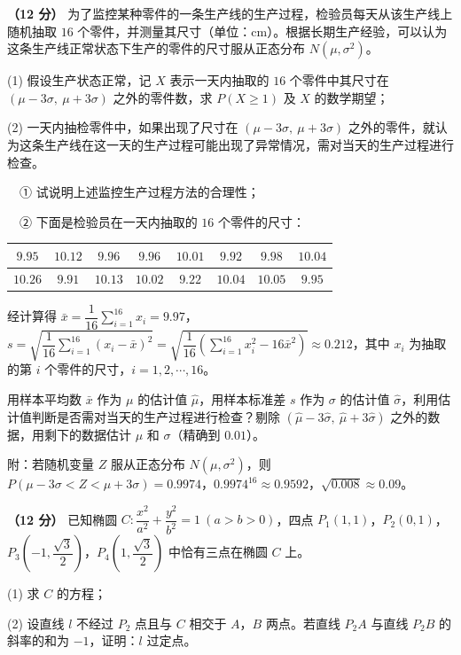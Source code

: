 \begin{question}
\textbf{（12 分）} 为了监控某种零件的一条生产线的生产过程，检验员每天从该生产线上随机抽取 $16$ 个零件，并测量其尺寸（单位：$\mathrm{cm}$）。根据长期生产经验，可以认为这条生产线正常状态下生产的零件的尺寸服从正态分布 $N\left(\mu,\sigma^{2}\right)$。

  (1) 假设生产状态正常，记 $X$ 表示一天内抽取的 $16$ 个零件中其尺寸在 $(\mu-3\sigma,\ \mu+3\sigma)$ 之外的零件数，求 $P(X\ge1)$ 及 $X$ 的数学期望；

  (2) 一天内抽检零件中，如果出现了尺寸在 $(\mu-3\sigma,\ \mu+3\sigma)$ 之外的零件，就认为这条生产线在这一天的生产过程可能出现了异常情况，需对当天的生产过程进行检查。

  　① 试说明上述监控生产过程方法的合理性；

  　② 下面是检验员在一天内抽取的 $16$ 个零件的尺寸：

\begin{center}
\begingroup\setlength{\tabcolsep}{4pt}
\begin{tabular}{cccccccc}
\toprule
$9.95$ & $10.12$ & $9.96$ & $9.96$ & $10.01$ & $9.92$ & $9.98$ & $10.04$ \\
\midrule
$10.26$ & $9.91$ & $10.13$ & $10.02$ & $9.22$ & $10.04$ & $10.05$ & $9.95$ \\
\bottomrule
\end{tabular}
\endgroup
\end{center}

  经计算得 $\bar x=\dfrac1{16}\sum\limits_{i=1}^{16}x_i=9.97$，$s=\sqrt{\dfrac1{16}\sum\limits_{i=1}^{16}\left(x_i-\bar x\right)^{2}}=\sqrt{\dfrac1{16}\left(\sum\limits_{i=1}^{16}x_i^{2}-16\bar x^{2}\right)}\approx0.212$，其中 $x_i$ 为抽取的第 $i$ 个零件的尺寸，$i=1,2,\cdots,16$。

  用样本平均数 $\bar x$ 作为 $\mu$ 的估计值 $\hat\mu$，用样本标准差 $s$ 作为 $\sigma$ 的估计值 $\hat\sigma$，利用估计值判断是否需对当天的生产过程进行检查？剔除 $\left(\hat\mu-3\hat\sigma,\ \hat\mu+3\hat\sigma\right)$ 之外的数据，用剩下的数据估计 $\mu$ 和 $\sigma$（精确到 $0.01$）。

  附：若随机变量 $Z$ 服从正态分布 $N\left(\mu,\sigma^{2}\right)$，则 $P(\mu-3\sigma<Z<\mu+3\sigma)=0.9974$，$0.9974^{16}\approx0.9592$，$\sqrt{0.008}\approx0.09$。

\end{question}
\begin{question}
\textbf{（12 分）} 已知椭圆 $C:\dfrac{x^{2}}{a^{2}}+\dfrac{y^{2}}{b^{2}}=1\ (a>b>0)$，四点 $P_1(1,1)$，$P_2(0,1)$，$P_3\left(-1,\dfrac{\sqrt3}2\right)$，$P_4\left(1,\dfrac{\sqrt3}2\right)$ 中恰有三点在椭圆 $C$ 上。

  (1) 求 $C$ 的方程；

  (2) 设直线 $l$ 不经过 $P_2$ 点且与 $C$ 相交于 $A$，$B$ 两点。若直线 $P_2A$ 与直线 $P_2B$ 的斜率的和为 $-1$，证明：$l$ 过定点。

\end{question}

